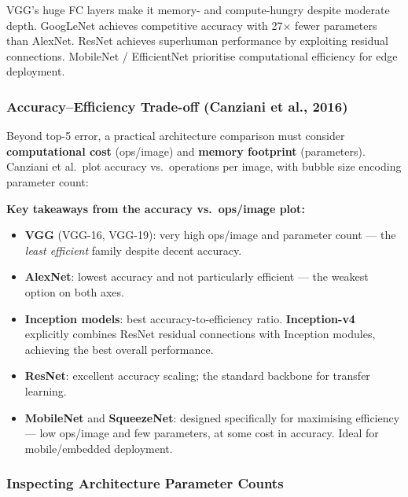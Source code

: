 \documentclass[11pt,a4paper]{article}
\begin{document}
\begin{insightbox}
VGG's huge FC layers make it memory- and compute-hungry despite moderate depth. GoogLeNet achieves competitive accuracy with 27$\times$ fewer parameters than AlexNet. ResNet achieves superhuman performance by exploiting residual connections. MobileNet / EfficientNet prioritise computational efficiency for edge deployment.
\end{insightbox}

\subsubsection{Accuracy–Efficiency Trade-off (Canziani et al., 2016)}

Beyond top-5 error, a practical architecture comparison must consider \textbf{computational cost} (ops/image) and \textbf{memory footprint} (parameters). Canziani et al.\ plot accuracy vs.\ operations per image, with bubble size encoding parameter count:

\begin{tcolorbox}[colback=LightBlue,colframe=AccentBlue,boxrule=0.8pt,arc=3pt]
\textbf{Key takeaways from the accuracy vs.\ ops/image plot:}
\begin{itemize}
  \item \textbf{VGG} (VGG-16, VGG-19): very high ops/image and parameter count — the \emph{least efficient} family despite decent accuracy.
  \item \textbf{AlexNet}: lowest accuracy and not particularly efficient — the weakest option on both axes.
  \item \textbf{Inception models}: best accuracy-to-efficiency ratio. \textbf{Inception-v4} explicitly combines ResNet residual connections with Inception modules, achieving the best overall performance.
  \item \textbf{ResNet}: excellent accuracy scaling; the standard backbone for transfer learning.
  \item \textbf{MobileNet} and \textbf{SqueezeNet}: designed specifically for maximising efficiency — low ops/image and few parameters, at some cost in accuracy. Ideal for mobile/embedded deployment.
\end{itemize}
\end{tcolorbox}

\subsubsection{Inspecting Architecture Parameter Counts}
\end{document}
